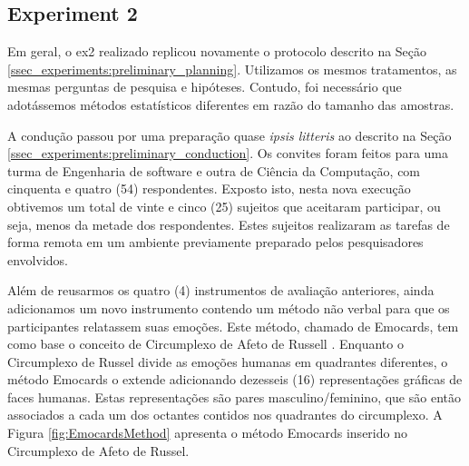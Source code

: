 


\subsection{Experiment 2}
\label{ssec_experiments:Experiment2}

Em geral, o \ac{ex2} realizado replicou novamente o protocolo descrito na Seção \ref{ssec_experiments:preliminary_planning}.
Utilizamos os mesmos tratamentos, as mesmas perguntas de pesquisa e hipóteses.
Contudo, foi necessário que adotássemos métodos estatísticos diferentes em razão do tamanho das amostras.

A condução passou por uma preparação quase \textit{ipsis litteris} ao descrito na Seção \ref{ssec_experiments:preliminary_conduction}. 
Os convites foram feitos para uma turma de Engenharia de software e outra de Ciência da Computação, com cinquenta e quatro (54) respondentes.
Exposto isto, nesta nova execução obtivemos um total de vinte e cinco (25) sujeitos que aceitaram participar, ou seja, menos da metade dos respondentes.
Estes sujeitos realizaram as tarefas de forma remota em um ambiente previamente preparado pelos pesquisadores envolvidos.

Além de reusarmos os quatro (4) instrumentos de avaliação anteriores, ainda adicionamos um novo instrumento contendo um método não verbal para que os participantes relatassem suas emoções. 
Este método, chamado de Emocards, tem como base o conceito de Circumplexo de Afeto de Russell \cite{desmet:2001}.
Enquanto o Circumplexo de Russel divide as emoções humanas em quadrantes diferentes, o método Emocards o extende adicionando dezesseis (16) representações gráficas de faces humanas.
Estas representações são pares masculino/feminino, que são então associados a cada um dos octantes contidos nos quadrantes do circumplexo. 
A Figura \ref{fig:EmocardsMethod} apresenta o método Emocards inserido no Circumplexo de Afeto de Russel. 

